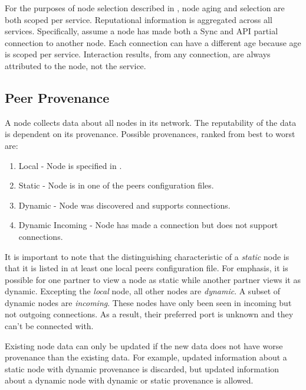 For the purposes of node selection described in , node aging and selection are both scoped per service.
Reputational information is aggregated across all services.
Specifically, assume a node has made both a Sync and API partial connection to another node.
Each connection can have a different age because age is scoped per service.
Interaction results, from any connection, are always attributed to the node, not the service.

\subsection{Peer Provenance}

A node collects data about all nodes in its network.
The reputability of the data is dependent on its provenance.
Possible provenances, ranked from best to worst are:
\begin{enumerate}
	\item{Local - Node is specified in .}
	\item{Static - Node is in one of the peers configuration files.}
	\item{Dynamic - Node was discovered and supports connections.}
	\item{Dynamic Incoming - Node has made a connection but does not support connections.}
\end{enumerate}

It is important to note that the distinguishing characteristic of a \emph{static} node is that it is listed in at least one local peers configuration file.
For emphasis, it is possible for one partner to view a node as static while another partner views it as dynamic.
Excepting the \emph{local} node, all other nodes are \emph{dynamic}.
A subset of dynamic nodes are \emph{incoming}.
These nodes have only been seen in incoming but not outgoing connections.
As a result, their preferred port is unknown and they can't be connected with.

Existing node data can only be updated if the new data does not have worse provenance than the existing data.
For example, updated information about a static node with dynamic provenance is discarded, but updated information about a dynamic node with dynamic or static provenance is allowed.

